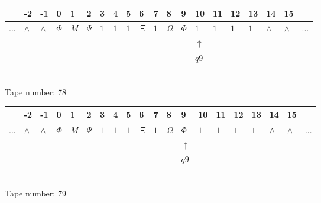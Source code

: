 \documentclass[11pt]{article}
\begin{document}
\begin{table}[H]
\centering
\begin{tabular}{llllllllllllllllllll}
 & -2 & -1 & 0 & 1 & 2 & 3 & 4 & 5 & 6 & 7 & 8 & 9 & 10 & 11 & 12 & 13 & 14 & 15 & \\
\hline
$...$ & \multicolumn{1}{|l|}{$\wedge$} & \multicolumn{1}{|l|}{$\wedge$} & \multicolumn{1}{|l|}{$\Phi$} & \multicolumn{1}{|l|}{$M$} & \multicolumn{1}{|l|}{$\Psi$} & \multicolumn{1}{|l|}{$1$} & \multicolumn{1}{|l|}{$1$} & \multicolumn{1}{|l|}{$1$} & \multicolumn{1}{|l|}{$\Xi$} & \multicolumn{1}{|l|}{$1$} & \multicolumn{1}{|l|}{$\Omega$} & \multicolumn{1}{|l|}{$\Phi$} & \multicolumn{1}{|l|}{$1$} & \multicolumn{1}{|l|}{$1$} & \multicolumn{1}{|l|}{$1$} & \multicolumn{1}{|l|}{$1$} & \multicolumn{1}{|l|}{$\wedge$} & \multicolumn{1}{|l|}{$\wedge$} & $...$\\
\hline
&  &  &  &  &  &  &  &  &  &  &  &  & $\uparrow$ &  &  &  &  &  &  \\
&  &  &  &  &  &  &  &  &  &  &  &  & $ q9 $ &  &  &  &  &  &  \\
\end{tabular}
\\
Tape number: 78
\noindent\makebox[\linewidth]{\hdashrule{\textwidth}{1pt}{1pt}}\end{table}

\begin{table}[H]
\centering
\begin{tabular}{llllllllllllllllllll}
 & -2 & -1 & 0 & 1 & 2 & 3 & 4 & 5 & 6 & 7 & 8 & 9 & 10 & 11 & 12 & 13 & 14 & 15 & \\
\hline
$...$ & \multicolumn{1}{|l|}{$\wedge$} & \multicolumn{1}{|l|}{$\wedge$} & \multicolumn{1}{|l|}{$\Phi$} & \multicolumn{1}{|l|}{$M$} & \multicolumn{1}{|l|}{$\Psi$} & \multicolumn{1}{|l|}{$1$} & \multicolumn{1}{|l|}{$1$} & \multicolumn{1}{|l|}{$1$} & \multicolumn{1}{|l|}{$\Xi$} & \multicolumn{1}{|l|}{$1$} & \multicolumn{1}{|l|}{$\Omega$} & \multicolumn{1}{|l|}{$\Phi$} & \multicolumn{1}{|l|}{$1$} & \multicolumn{1}{|l|}{$1$} & \multicolumn{1}{|l|}{$1$} & \multicolumn{1}{|l|}{$1$} & \multicolumn{1}{|l|}{$\wedge$} & \multicolumn{1}{|l|}{$\wedge$} & $...$\\
\hline
&  &  &  &  &  &  &  &  &  &  &  & $\uparrow$ &  &  &  &  &  &  &  \\
&  &  &  &  &  &  &  &  &  &  &  & $ q9 $ &  &  &  &  &  &  &  \\
\end{tabular}
\\
Tape number: 79
\noindent\makebox[\linewidth]{\hdashrule{\textwidth}{1pt}{1pt}}\end{table}
\end{document}
